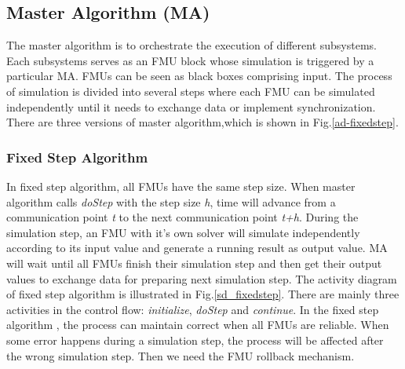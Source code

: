\subsection{Master Algorithm (MA)}
The master algorithm is to orchestrate the execution of different subsystems. Each subsystems serves as an FMU block whose simulation is triggered by a particular MA. FMUs can be seen as black boxes comprising input. The process of simulation is divided into several steps where each FMU can be simulated independently until it needs to exchange data or implement synchronization. There are three versions of master algorithm,which is shown in Fig.\ref{ad-fixedstep}.
\begin{figure}[htbp]
\end{figure}
\subsubsection{Fixed Step Algorithm}
In fixed step algorithm, all FMUs have the same step size. When master algorithm calls \emph{doStep} with the step size \emph{h}, time will advance from a communication point \emph{t} to the next communication point \emph{t+h}. During the simulation step, an FMU with it's own solver will simulate independently according to its input value and generate a running result as output value. MA will wait until all FMUs finish their simulation step and then get their output values to exchange data for preparing next simulation step. The activity diagram of fixed step algorithm is illustrated in Fig.\ref{sd_fixedstep}. There are mainly three activities in the control flow: \emph{initialize}, \emph{doStep} and \emph{continue}. In the fixed step algorithm \cite{BromanBGLMTW13}, the process can maintain correct when all FMUs are reliable. When some error happens during a simulation step, the process will be affected after the wrong simulation step. Then we need the FMU rollback mechanism.
